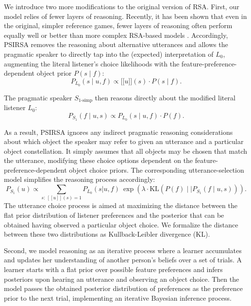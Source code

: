 \documentclass[10pt,a4paper]{article}
\newcommand{\sem}[1]{\mbox{$[\![$#1$]\!]$}}
\begin{document}
We introduce two more modifications to the original version of RSA. First, our model relies of fewer layers of reasoning. Recently, it has been shown that even in the original, simpler reference games, fewer layers of reasoning often perform equally well or better than more complex RSA-based models \cite{sikos2019}.
Accordingly, PSIRSA removes the reasoning about alternative utterances and allows the pragmatic speaker to directly tap into the (expected) interpretation of $L_0$, augmenting the literal listener's choice likelihoods with the feature-preference-dependent object prior $P(s\mid f)$:
\begin{equation}
P_{L_{0}}(s\mid u,f) \propto \sem{$u$}(s) \cdot P(s\mid f).
\end{equation}

The pragmatic speaker $S_{1\textrm{-simp}}$ then reasons directly about the modified literal listener $L_{0}$: 
\begin{equation}
P_{S_{1}}(f\mid u,s) \propto P_{L_{0}}(s\mid u,f) \cdot P(f).
\end{equation}

As a result, PSIRSA ignores any indirect pragmatic reasoning considerations about which object the speaker may refer to given an utterance and a particular object constellation.
It simply assumes that all objects may be chosen that match the utterance, modifying these choice options dependent on the feature-preference-dependent object choice priors. The corresponding utterance-selection model simplifies the reasoning process accordingly:
\begin{equation}
P_{S_1}(u) \propto \sum_{s:\  [\![u]\!](s)=1} P_{L_0}(s|u,f)\ \exp(\lambda \cdot \textrm{KL}(P(f)\mid\mid P_{S_{1}}(f\mid u,s))).
\label{eq:kldivlambdasimp}
\end{equation}
The utterance choice process is aimed at maximizing the distance between the flat prior distribution of listener preferences and the posterior that can be obtained having observed a particular object choice. We formalize the distance between these two distributions as Kullback-Leibler divergence (KL).

Second, we model reasoning as an iterative process where a learner accumulates and updates her understanding of another person's beliefs over a set of trials. A learner starts with a flat prior over possible feature preferences and infers posteriors upon hearing an utterance and observing an object choice. Then the model passes the obtained posterior distribution of preferences as the preference prior to the next trial, implementing an iterative Bayesian inference process.
\end{document}
